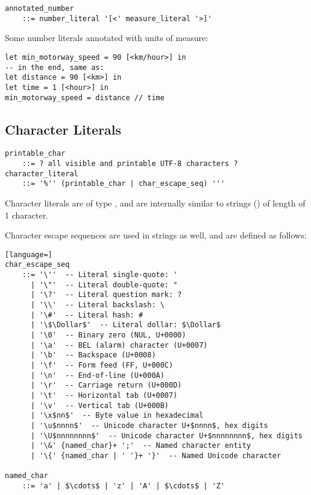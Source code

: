 \syntax\begin{lstlisting}
annotated_number 
    ::= number_literal '[<' measure_literal '>]'
\end{lstlisting}

\example Some number literals annotated with units of measure:
\begin{lstlisting}
let min_motorway_speed = 90 [<km/hour>] in
-- in the end, same as:
let distance = 90 [<km>] in
let time = 1 [<hour>] in
min_motorway_speed = distance // time
\end{lstlisting}






\subsection{Character Literals}
\label{sec:characterliterals}

\syntax\begin{lstlisting}[deletekeywords={and,all}]
printable_char 
    ::= ? all visible and printable UTF-8 characters ? 
character_literal 
    ::= '%'' (printable_char | char_escape_seq) '''
\end{lstlisting}

Character literals are of type , and are internally similar to strings () of length of 1 character. 

Character escape sequences are used in strings as well, and are defined as follows: 

\syntax\begin{lstlisting}[language=]
char_escape_seq 
    ::= '\''  -- Literal single-quote: '
      | '\"'  -- Literal double-quote: "
      | '\?'  -- Literal question mark: ?
      | '\\'  -- Literal backslash: \
      | '\#'  -- Literal hash: #
      | '\$\Dollar$'  -- Literal dollar: $\Dollar$
      | '\0'  -- Binary zero (NUL, U+0000)
      | '\a'  -- BEL (alarm) character (U+0007)
      | '\b'  -- Backspace (U+0008)
      | '\f'  -- Form feed (FF, U+000C)
      | '\n'  -- End-of-line (U+000A)
      | '\r'  -- Carriage return (U+000D)
      | '\t'  -- Horizontal tab (U+0007)
      | '\v'  -- Vertical tab (U+000B)
      | '\x$nn$'  -- Byte value in hexadecimal
      | '\u$nnnn$'  -- Unicode character U+$nnnn$, hex digits
      | '\U$nnnnnnnn$'  -- Unicode character U+$nnnnnnnn$, hex digits
      | '\&' {named_char}+ ';'  -- Named character entity
      | '\{' {named_char | ' '}+ '}'  -- Named Unicode character
      
named_char 
    ::= 'a' | $\cdots$ | 'z' | 'A' | $\cdots$ | 'Z'
\end{lstlisting}

